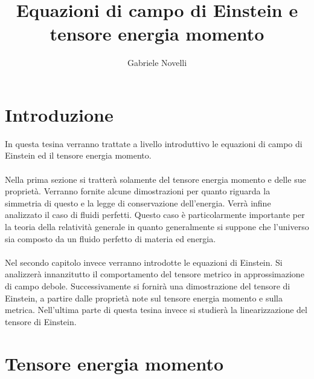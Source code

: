 \documentclass[]{report}
\title{Equazioni di campo di Einstein e tensore energia momento}
\author{Gabriele Novelli}
\date{}
\theoremstyle{definition}
\theoremstyle{Theorem}
\theoremstyle{definition}
\theoremstyle{definition}
\theoremstyle{definition}
\begin{document}
\maketitle

\section{Introduzione}
In questa tesina verranno trattate a livello introduttivo le equazioni di campo di Einstein ed il tensore energia momento.\\
\\
Nella prima sezione si tratterà solamente del tensore energia momento e delle sue proprietà. Verranno fornite alcune dimostrazioni per quanto riguarda la simmetria di questo e la legge di conservazione dell'energia. Verrà infine analizzato il caso di fluidi perfetti. Questo caso è particolarmente importante per la teoria della relatività generale in quanto generalmente si suppone che l'universo sia composto da un fluido perfetto di materia ed energia.\\
\\
Nel secondo capitolo invece verranno introdotte le equazioni di Einstein. Si analizzerà innanzitutto il comportamento del tensore metrico in approssimazione di campo debole. Successivamente si fornirà una dimostrazione del tensore di Einstein, a partire dalle proprietà note sul tensore energia momento e sulla metrica. Nell'ultima parte di questa tesina invece si studierà la linearizzazione del tensore di Einstein.
\newpage
\section{Tensore energia momento}
\end{document}
